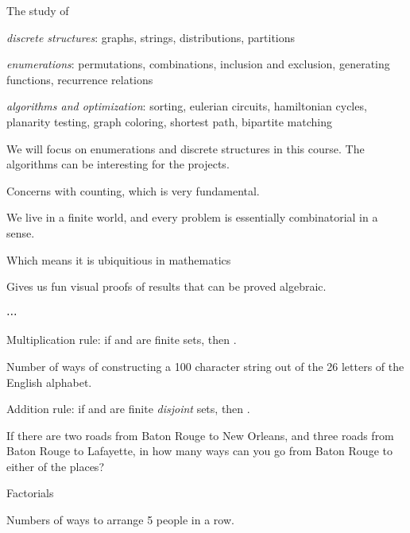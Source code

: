 \startchapter [title={Combinatorics basics}]
	
	\startsection [title={What is combinatorics?}]
		The study of
		\startitemize [r, joinedup]
			\item  \emph{discrete structures}: graphs, strings, distributions, partitions
			\item  \emph{enumerations}: permutations, combinations, inclusion and exclusion, generating functions, recurrence relations
			\item  \emph{algorithms and optimization}: sorting, eulerian circuits, hamiltonian cycles, planarity testing, graph coloring, shortest path, bipartite matching
		\stopitemize

		We will focus on enumerations and discrete structures in this course. The algorithms can be interesting for the projects.

		\startsubject [title={Why is it interesting?}]
			\startitemize [1, joinedup]
				\item  Concerns with counting, which is very fundamental.
				\item  We live in a finite world, and every problem is essentially combinatorial in a sense.
				\item  Which means it is ubiquitious in mathematics
				\item  Gives us fun visual proofs of results that can be proved algebraic.
				\item  ⋯
			\stopitemize
		\stopsubject
	\stopsection

	\startsection [title={Enumerations}]
				
		\startitemize [1, joinedup]
		
			\item  Multiplication rule: if  and  are finite sets, then .

				Number of ways of constructing a 100 character string out of the 26 letters of the English alphabet.

			\item  Addition rule: if  and  are finite \emph{disjoint} sets, then .

				If there are two roads from Baton Rouge to New Orleans, and three roads from Baton Rouge to Lafayette, in how many ways can you go from Baton Rouge to either of the places?

			\item  Factorials

				Numbers of ways to arrange 5 people in a row.
			
